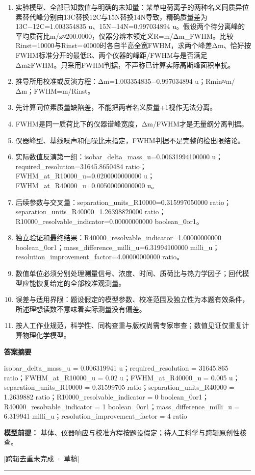 \documentclass[UTF8,11pt,a4paper]{ctexart}
\begin{document}
\begin{enumerate}
\item 实验模型、全部已知数值与明确的未知量：某单电荷离子的两种名义同质异位素替代峰分别由13C替换12C与15N替换14N导致，精确质量差为13C−12C=1.003354835 u、15N−14N=0.997034894 u。假设两个待分离峰的平均质荷比m/z≈200.0000，仪器分辨本领定义R=m/Δm\_FWHM。比较Rinst=10000与Rinst=40000时各自半高全宽FWHM，求两个峰差Δm、恰好按FWHM标准分开的最低R、两个仪器的峰距/FWHM与是否满足Δm≥FWHM。只采用FWHM判据，不声称已计算实际高斯峰面积串扰。
\item 推导所用校准或反演方程：Δm=1.003354835−0.997034894 u；Rmin≈m/Δm；FWHM=m/Rinst。
\item 先计算同位素质量缺陷差，不能把两者名义质量+1视作无法分离。
\item FWHM是同一质荷比下的仪器谱峰宽度，Δm/FWHM才是无量纲分离判据。
\item 仪器峰型、基线噪声和信噪比未指定，FWHM判据不是完整的检出限结论。
\item 实际数值反演第一组：isobar\_delta\_mass\_u=0.00631994100000 u；required\_resolution=31645.8650484 ratio；FWHM\_at\_R10000\_u=0.0200000000000 u；FWHM\_at\_R40000\_u=0.00500000000000 u。
\item 后续参数与交叉量：separation\_units\_R10000=0.315997050000 ratio；separation\_units\_R40000=1.26398820000 ratio；R10000\_resolvable\_indicator=0.00000000000 boolean\_0or1。
\item 独立验证和最终结果：R40000\_resolvable\_indicator=1.00000000000 boolean\_0or1；mass\_difference\_milli\_u=6.31994100000 milli\_u；resolution\_improvement\_factor=4.00000000000 ratio。
\item 数值单位必须分别处理测量信号、浓度、时间、质荷比与热力学因子；回代模型应能恢复给定的全部校准观测量。
\item 误差与适用界限：题设假定的模型参数、校准范围及独立性为本题有效条件，所述理想读数不意味着实际测量没有偏差。
\item 按人工作业规范，科学性、同构查重与版权尚需专家审查；数值见证仅重复计算物理化学模型。
\end{enumerate}
\noindent\textbf{答案摘要}\par
isobar\_delta\_mass\_u = 0.006319941 u；required\_resolution = 31645.865 ratio；FWHM\_at\_R10000\_u = 0.02 u；FWHM\_at\_R40000\_u = 0.005 u；separation\_units\_R10000 = 0.31599705 ratio；separation\_units\_R40000 = 1.2639882 ratio；R10000\_resolvable\_indicator = 0 boolean\_0or1；R40000\_resolvable\_indicator = 1 boolean\_0or1；mass\_difference\_milli\_u = 6.319941 milli\_u；resolution\_improvement\_factor = 4 ratio\par
\noindent\textbf{模型前提：}
基体、仪器响应与校准方程按题设假定；待人工科学与跨辑原创性核查。\par
\noindent\textcolor{red!65!black}{[跨辑去重未完成 · 草稿]} \par
\medskip\hrule\medskip
{}
\end{document}
